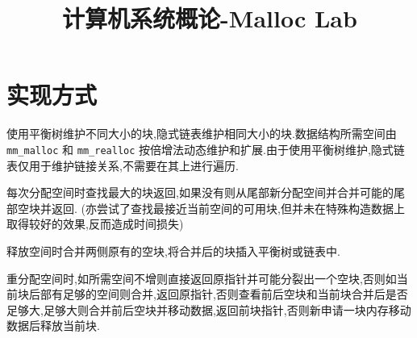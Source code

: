 
\usepackage{../../homeworks_preamble}
\title{计算机系统概论-Malloc Lab}


    \maketitle
    \section{实现方式}
    使用平衡树维护不同大小的块,隐式链表维护相同大小的块.数据结构所需空间由 \texttt{mm\_malloc} 和 \texttt{mm\_realloc} 按倍增法动态维护和扩展.由于使用平衡树维护,隐式链表仅用于维护链接关系,不需要在其上进行遍历.

    每次分配空间时查找最大的块返回,如果没有则从尾部新分配空间并合并可能的尾部空块并返回. (亦尝试了查找最接近当前空间的可用块,但并未在特殊构造数据上取得较好的效果,反而造成时间损失)

    释放空间时合并两侧原有的空块,将合并后的块插入平衡树或链表中.

    重分配空间时,如所需空间不增则直接返回原指针并可能分裂出一个空块,否则如当前块后部有足够的空间则合并,返回原指针,否则查看前后空块和当前块合并后是否足够大,足够大则合并前后空块并移动数据,返回前块指针,否则新申请一块内存移动数据后释放当前块.

